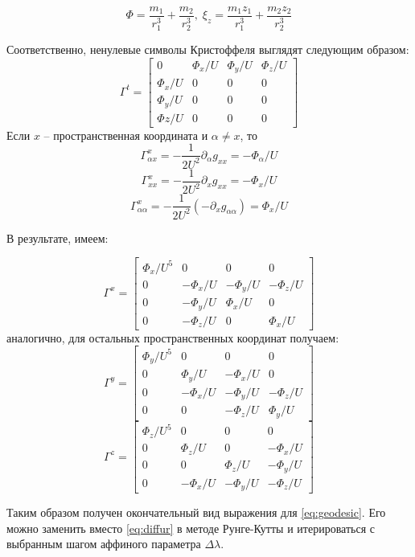 $$
	\Phi = \frac{m_1}{r_1^3} +\frac{m_2}{r_2^3},\;  \xi_z = \frac{m_1 z_1}{r_1^3} + \frac{m_2 z_2}{r_2^3} 
$$

Соответственно, ненулевые символы Кристоффеля выглядят следующим образом: 
$$
\Gamma^t = \left[\begin{matrix}
	0 & \Phi_x/U & \Phi_y/U & \Phi_z/U \\
	\Phi_x/U & 0 & 0 & 0 \\
	\Phi_y/U & 0 & 0 & 0 \\
	\Phi z/U & 0 & 0 & 0
\end{matrix}\right]
$$
Если $x$ -- пространственная координата и $\alpha\ne x$, то 
$$
	\Gamma^x_{\alpha x} = -\frac{1}{2U^2}\partial_\alpha g_{xx} = -\Phi_\alpha/U
$$
$$
	\Gamma^x_{xx} = -\frac{1}{2U^2}\partial_x g_{xx} = -\Phi_x/U
$$
$$ 
	\Gamma^x_{\alpha\alpha} = -\frac{1}{2U^2}(-\partial_x g_{\alpha\alpha}) = \Phi_x/U
$$

В результате, имеем:

$$
\Gamma^x = \left[\begin{matrix}
	\Phi_x/U^5 & 0         &     0     &    0 \\
	0          & -\Phi_x/U & -\Phi_y/U & -\Phi_z/U \\
	0          & -\Phi_y/U & \Phi_x/U &  0 \\
	0          & -\Phi_z/U &  0       &  \Phi_x/U 
\end{matrix}\right]
$$
аналогично, для остальных пространственных координат получаем:
$$
\Gamma^y = \left[\begin{matrix}
	\Phi_y/U^5 & 0         &     0     &    0 \\
	0          & \Phi_y/U & -\Phi_x/U & 0 \\
	0          & -\Phi_x/U & -\Phi_y/U &  -\Phi_z/U \\
	0          & 0 &   -\Phi_z/U     &  \Phi_y/U 
\end{matrix}\right]
$$
$$
\Gamma^z = \left[\begin{matrix}
	\Phi_z/U^5 & 0         &     0     &    0 \\
	0          & \Phi_z/U  & 0        & -\Phi_x/U \\
	0          & 0         & \Phi_z/U &  -\Phi_y/U \\
	0          & -\Phi_x/U &  -\Phi_y/U     &  -\Phi_z/U 
\end{matrix}\right]
$$

Таким образом получен окончательный вид выражения для \eqref{eq:geodesic}. Его можно заменить вместо \eqref{eq:diffur} в методе Рунге-Кутты и итерироваться с выбранным шагом аффиного параметра $\Delta\lambda$.

